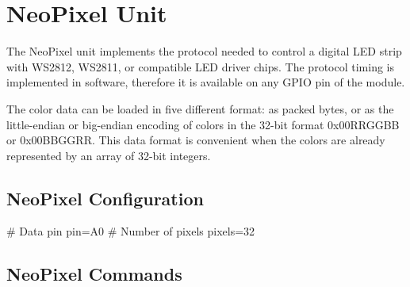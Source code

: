 \section{NeoPixel Unit}

The NeoPixel unit implements the protocol needed to control a digital \gls{LED} strip with WS2812, WS2811, or compatible \gls{LED} driver chips. The protocol timing is implemented in software, therefore it is available on any GPIO pin of the module.

The color data can be loaded in five different format: as packed bytes, or as the little-endian or big-endian encoding of colors in the 32-bit format 0x00RRGGBB or 0x00BBGGRR. This data format is convenient when the colors are already represented by an array of 32-bit integers.

\subsection{NeoPixel Configuration}

\begin{inicode}
# Data pin
pin=A0
# Number of pixels
pixels=32
\end{inicode}

\subsection{NeoPixel Commands}

